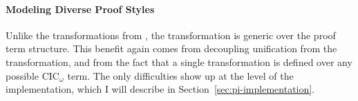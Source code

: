 \paragraph{Modeling Diverse Proof Styles}
Unlike the transformations from \sysname, the \toolnamec transformation is generic over the proof term structure.
This benefit again comes from decoupling unification from the transformation,
and from the fact that a single transformation is defined over any possible CIC$_{\omega}$ term.
The only difficulties show up at the level of the implementation,
which I will describe in Section~\ref{sec:pi-implementation}.

